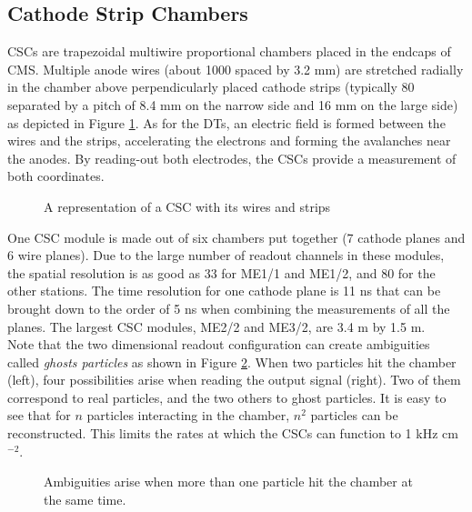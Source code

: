     		\subsection{Cathode Strip Chambers}
    		\label{sec:muon_chambers__cathode_strip_chambers}

    			CSCs are trapezoidal multiwire proportional chambers placed in the endcaps of CMS. Multiple anode wires (about 1000 spaced by 3.2 mm) are stretched radially in the chamber above perpendicularly placed cathode strips (typically 80 separated by a pitch of 8.4 mm on the narrow side and 16 mm on the large side) as depicted in Figure \ref{fig:muon_chambers__csc}. As for the DTs, an electric field is formed between the wires and the strips, accelerating the electrons and forming the avalanches near the anodes. By reading-out both electrodes, the CSCs provide a measurement of both coordinates.

    			\begin{figure}[h!]
    				\centering
    				\caption{A representation of a CSC with its wires and strips \Cite{CMS_Performances}}
    				\label{fig:muon_chambers__csc}
    			\end{figure}

    			One CSC module is made out of six chambers put together (7 cathode planes and 6 wire planes). Due to the large number of readout channels in these modules, the spatial resolution is as good as 33 \um{} for ME1/1 and ME1/2, and 80 \um{} for the other stations. The time resolution for one cathode plane is 11 ns that can be brought down to the order of 5 ns when combining the measurements of all the planes. The largest CSC modules, ME2/2 and ME3/2, are 3.4 m by 1.5 m. \\

    			Note that the two dimensional readout configuration can create ambiguities called \emph{ghosts particles} as shown in Figure \ref{fig:muon_chambers__ghosts}. When two particles hit the chamber (left), four possibilities arise when reading the output signal (right). Two of them correspond to real particles, and the two others to ghost particles. It is easy to see that for $ n $ particles interacting in the chamber, $ n^2 $ particles can be reconstructed. This limits the rates at which the CSCs can function to 1 kHz cm$ ^{-2} $.

    			\begin{figure}[h!]
    				\centering
    				\caption{Ambiguities arise when more than one particle hit the chamber at the same time.}
    				\label{fig:muon_chambers__ghosts}
    			\end{figure}

